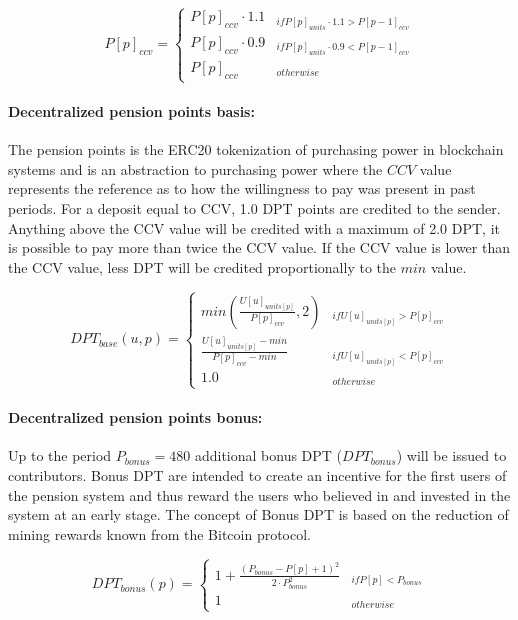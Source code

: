 \begin{equation}
P[p]_{ccv} = \begin{cases} 
P[p]_{ccv} \cdot 1.1 & _{if P[p]_{units} \cdot 1.1 > P[p-1]_{ccv}} \\
P[p]_{ccv} \cdot 0.9 & _{if P[p]_{units} \cdot 0.9 < P[p-1]_{ccv}} \\
P[p]_{ccv} & _{otherwise}
\end{cases}
\end{equation}

\paragraph*{Decentralized pension points basis:}
The pension points is the ERC20 tokenization of purchasing power in blockchain systems and is an abstraction to purchasing power where the $CCV$ value represents the reference as to how the willingness to pay was present in past periods. For a deposit equal to CCV, 1.0 DPT points are credited to the sender. Anything above the CCV value will be credited with a maximum of 2.0 DPT, it is possible to pay more than twice the CCV value. If the CCV value is lower than the CCV value, less DPT will be credited proportionally to the $min$ value.

\begin{dmath}
DPT_{base}(u, p) = \begin{cases} 
min(\frac{U[u]_{units[p]}} {P[p]_{ccv}}, 2) 
  & _{if U[u]_{units[p]} > P[p]_{ccv}} \\
\frac{U[u]_{units[p]} - min} {P[p]_{ccv} - min} 
  & _{if U[u]_{units[p]} < P[p]_{ccv}} \\
1.0 & _{otherwise}
\end{cases}
\end{dmath}

\paragraph*{Decentralized pension points bonus:}
Up to the period $P_{bonus} = 480$ additional bonus DPT ($DPT_{bonus}$) will be issued to contributors. Bonus DPT are intended to create an incentive for the first users of the pension system and thus reward the users who believed in and invested in the system at an early stage. The concept of Bonus DPT is based on the reduction of mining rewards known from the Bitcoin protocol.

\begin{equation}
DPT_{bonus}(p) = \begin{cases} 
1 + \frac{(P_{bonus} - P[p] + 1)^2}
      {2 \cdot P_{bonus}^2} & _{if P[p] < P_{bonus}} \\
1 & _{otherwise} 
\end{cases}
\end{equation}